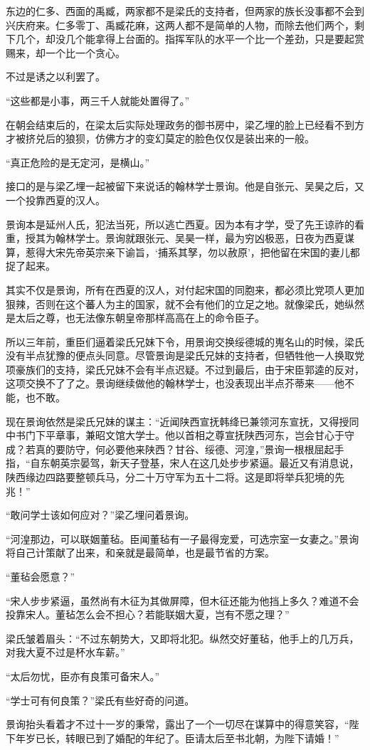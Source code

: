 东边的仁多、西面的禹臧，两家都不是梁氏的支持者，但两家的族长没事都不会到兴庆府来。仁多零丁、禹臧花麻，这两人都不是简单的人物，而除去他们两个，剩下几个，却没几个能拿得上台面的。指挥军队的水平一个比一个差劲，只是要起赏赐来，却一个比一个贪心。

不过是诱之以利罢了。

“这些都是小事，两三千人就能处置得了。”

在朝会结束后的，在梁太后实际处理政务的御书房中，梁乙埋的脸上已经看不到方才被挤兑后的狼狈，仿佛方才的变幻莫定的脸色仅仅是装出来的一般。

“真正危险的是无定河，是横山。”

接口的是与梁乙埋一起被留下来说话的翰林学士景询。他是自张元、吴昊之后，又一个投靠西夏的汉人。

景询本是延州人氏，犯法当死，所以逃亡西夏。因为本有才学，受了先王谅祚的看重，授其为翰林学士。景询就跟张元、吴昊一样，最为穷凶极恶，日夜为西夏谋算，惹得大宋先帝英宗亲下谕旨，‘捕系其孥，勿以赦原’，把他留在宋国的妻儿都捉了起来。

其实不仅是景询，所有在西夏的汉人，对付起宋国的同胞来，都必须比党项人更加狠辣，否则在这个蕃人为主的国家，就不会有他们的立足之地。就像梁氏，她纵然是太后之尊，也无法像东朝皇帝那样高高在上的命令臣子。

所以三年前，重臣们逼着梁氏兄妹下令，用景询交换绥德城的嵬名山的时候，梁氏没有半点犹豫的便点头同意。尽管景询是梁氏兄妹的支持者，但牺牲他一人换取党项豪族们的支持，梁氏兄妹不会有半点迟疑。不过到最后，由于宋臣郭逵的反对，这项交换不了了之。景询继续做他的翰林学士，也没表现出半点芥蒂来——他不能，也不敢。

现在景询依然是梁氏兄妹的谋主：“近闻陕西宣抚韩绛已兼领河东宣抚，又得授同中书门下平章事，兼昭文馆大学士。他以首相之尊宣抚陕西河东，岂会甘心于守成？若真的要防守，何必要他来陕西？甘谷、绥德、河湟，”景询一根根屈起手指，“自东朝英宗晏驾，新天子登基，宋人在这几处步步紧逼。最近又有消息说，陕西缘边四路要整顿兵马，分二十万守军为五十二将。这是即将举兵犯境的先兆！”

“敢问学士该如何应对？”梁乙埋问着景询。

“河湟那边，可以联姻董毡。臣闻董毡有一子最得宠爱，可选宗室一女妻之。”景询将自己计策献了出来，和亲就是最简单，也是最节省的方案。

“董毡会愿意？”

“宋人步步紧逼，虽然尚有木征为其做屏障，但木征还能为他挡上多久？难道不会投靠宋人。董毡怎么会不担心？若能联姻大夏，岂有不愿之理？”

梁氏皱着眉头：“不过东朝势大，又即将北犯。纵然交好董毡，他手上的几万兵，对我大夏不过是杯水车薪。”

“太后勿忧，臣亦有良策可备宋人。”

“学士可有何良策？”梁氏有些好奇的问道。

景询抬头看着才不过十一岁的秉常，露出了一个一切尽在谋算中的得意笑容，“陛下年岁已长，转眼已到了婚配的年纪了。臣请太后至书北朝，为陛下请婚！”

